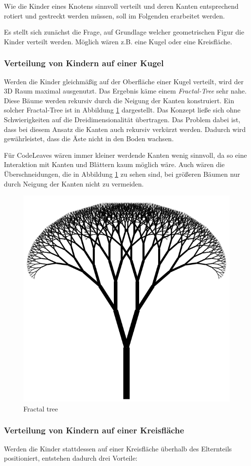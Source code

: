 Wie die Kinder eines Knotens sinnvoll verteilt und deren Kanten entsprechend rotiert und gestreckt werden müssen, soll im Folgenden erarbeitet werden.

Es stellt sich zunächst die Frage, auf Grundlage welcher geometrischen Figur die Kinder verteilt werden. Möglich wären z.B. eine Kugel oder eine Kreisfläche.

\subsubsection*{Verteilung von Kindern auf einer Kugel}
Werden die Kinder gleichmäßig auf der Oberfläche einer Kugel verteilt, wird der 3D Raum maximal ausgenutzt. Das Ergebnis käme einem \textit{Fractal-Tree} sehr nahe. Diese Bäume werden rekursiv durch die Neigung der Kanten konstruiert. Ein solcher Fractal-Tree ist in Abbildung \ref{fig:Fractal-Tree} dargestellt. Das Konzept ließe sich ohne Schwierigkeiten auf die Dreidimensionalität übertragen. Das Problem dabei ist, dass bei diesem Ansatz die Kanten auch rekursiv verkürzt werden. Dadurch wird gewährleistet, dass die Äste nicht in den Boden wachsen.

Für CodeLeaves wären immer kleiner werdende Kanten wenig sinnvoll, da so eine Interaktion mit Kanten und Blättern kaum möglich wäre. Auch wären die Überschneidungen, die in Abbildung \ref{fig:Fractal-Tree} zu sehen sind, bei größeren Bäumen nur durch Neigung der Kanten nicht zu vermeiden.

\begin{figure}[htb]
  \includegraphics[width=.5\textwidth]{figures/Fractal-Tree}
  \caption{Fractal tree \cite{rocchini2017fractal}}
  \label{fig:Fractal-Tree}
\end{figure}

\subsubsection*{Verteilung von Kindern auf einer Kreisfläche}
Werden die Kinder stattdessen auf einer Kreisfläche überhalb des Elternteils positioniert, entstehen dadurch drei Vorteile:

